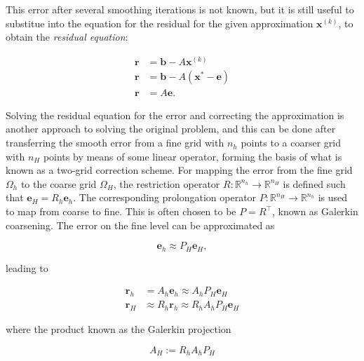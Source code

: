 This error after several smoothing iterations is not known, but it is still useful to substitue into the equation for the residual for the given approximation $\mathbf{x}^{(k)}$, to obtain the \emph{residual equation}:

\begin{equation}
	\begin{aligned}
	\mathbf{r} &= \mathbf{b} - A\mathbf{x}^{(k)} \\
	\mathbf{r} &= \mathbf{b} - A\left( \mathbf{x}^* - \mathbf{e} \right) \\
	\mathbf{r} &= A\mathbf{e}.
	\end{aligned}
\end{equation}


Solving the residual equation for the error and correcting the approximation is another approach to solving the original problem, and this can be done after transferring the smooth error from a fine grid with $n_h$ points to a coarser grid with $n_H$ points by means of some linear operator, forming the basis of what is known as a two-grid correction scheme. For mapping the error from the fine grid $\Omega_h$ to the coarse grid $\Omega_H$, the restriction operator $R : \mathbb{R}^{n_h} \rightarrow \mathbb{R}^{n_H}$ is defined such that $\mathbf{e}_H = R_h \mathbf{e}_h$. The corresponding prolongation operator $P : \mathbb{R}^{n_H} \rightarrow \mathbb{R}^{n_h}$ is used to map from coarse to fine. This is often chosen to be $P = R^\top$, known as Galerkin coarsening. The error on the fine level can be approximated as 

\begin{equation}
	\mathbf{e}_h \approx P_H \mathbf{e}_H,
\end{equation}

leading to

\begin{equation}
	\begin{aligned}
	\mathbf{r}_h & = A_h \mathbf{e}_h \approx A_h P_H \mathbf{e}_H \\
	\mathbf{r}_H & \approx R_h \mathbf{r}_h \approx R_h A_h P_H \mathbf{e}_H
	\end{aligned}
\end{equation}

where the product known as the Galerkin projection 

\begin{equation}
	A_H := R_h A_h P_H
\end{equation}


